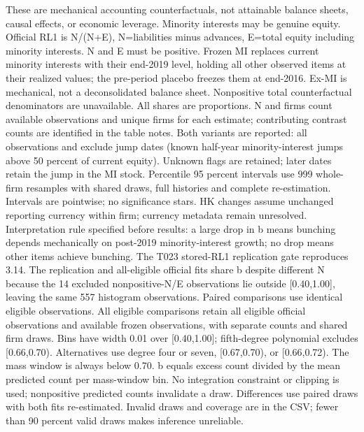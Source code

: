 \begin{table}[!htbp]
\begin{threeparttable}
\begin{tablenotes}[flushleft]
\item[] These are mechanical accounting counterfactuals, not attainable balance sheets, causal effects, or economic leverage. Minority interests may be genuine equity. Official RL1 is N/(N+E), N=liabilities minus advances, E=total equity including minority interests. N and E must be positive. Frozen MI replaces current minority interests with their end-2019 level, holding all other observed items at their realized values; the pre-period placebo freezes them at end-2016. Ex-MI is mechanical, not a deconsolidated balance sheet. Nonpositive total counterfactual denominators are unavailable. All shares are proportions. N and firms count available observations and unique firms for each estimate; contributing contrast counts are identified in the table notes. Both variants are reported: all observations and exclude jump dates (known half-year minority-interest jumps above 50 percent of current equity). Unknown flags are retained; later dates retain the jump in the MI stock. Percentile 95 percent intervals use 999 whole-firm resamples with shared draws, full histories and complete re-estimation. Intervals are pointwise; no significance stars. HK changes assume unchanged reporting currency within firm; currency metadata remain unresolved. Interpretation rule specified before results: a large drop in b means bunching depends mechanically on post-2019 minority-interest growth; no drop means other items achieve bunching. The T023 stored-RL1 replication gate reproduces 3.14. The replication and all-eligible official fits share b despite different N because the 14 excluded nonpositive-N/E observations lie outside [0.40,1.00], leaving the same 557 histogram observations. Paired comparisons use identical eligible observations. All eligible comparisons retain all eligible official observations and available frozen observations, with separate counts and shared firm draws. Bins have width 0.01 over [0.40,1.00]; fifth-degree polynomial excludes [0.66,0.70). Alternatives use degree four or seven, [0.67,0.70), or [0.66,0.72). The mass window is always below 0.70. b equals excess count divided by the mean predicted count per mass-window bin. No integration constraint or clipping is used; nonpositive predicted counts invalidate a draw. Differences use paired draws with both fits re-estimated. Invalid draws and coverage are in the CSV; fewer than 90 percent valid draws makes inference unreliable.
\end{tablenotes}
\end{threeparttable}
\end{table}

